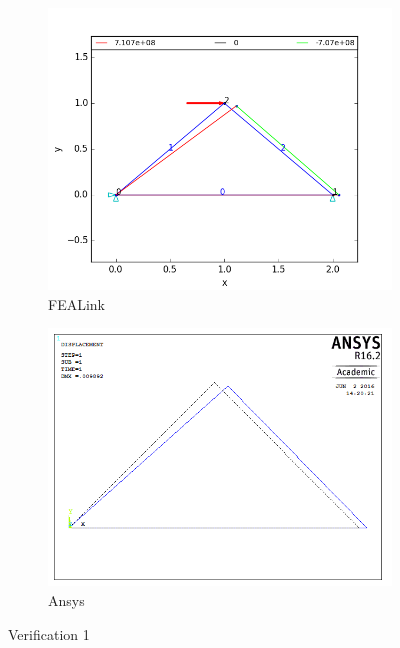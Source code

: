 \documentclass[11pt, oneside]{article}   	%
\begin{document}
\begin{figure}[h]
\centering
  \begin{subfigure}[b]{0.45\textwidth}
    \includegraphics[width=\textwidth]{Verification/FEALink/Verification1.png}
    \caption{FEALink}
    \label{fig:V1FEALink}
  \end{subfigure}
  \begin{subfigure}[b]{0.45\textwidth}
    \includegraphics[width=\textwidth]{Verification/Ansys/Verification1.png}
    \caption{Ansys}
    \label{fig:V1Ansys}
  \end{subfigure}
\caption{Verification 1}
\label{fig:Verification1}%
\end{figure}
\end{document}
